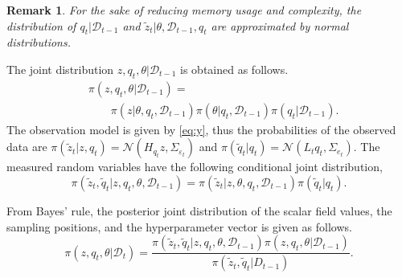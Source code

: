 \documentclass[letterpaper, 10 pt, conference]{ieeeconf}
\newtheorem{rem}[thm]{Remark} \newtheorem{example}[thm]{Example}
\newcommand{\mc}[1]{\mathcal{#1}} \newcommand{\mb}[1]{\mathbf{#1}}
\newcommand{\N}{\mc{N}}
\newcommand{\changed}[2]{{\color{blue} #2}}
\newcommand{\D}[2]{\mc{D}_{#2}}
\newcommand{\q}[1]{{q_{#1}}}
\begin{document}
\begin{rem}
For the sake of reducing memory usage and complexity, the distribution of $\q{t}|\D{0}{t - 1}$ and $\tilde{z}_{t}|\theta,\D{1}{t-1},\q{t}$ are approximated by normal distributions.
\end{rem}

The joint distribution $z,\q{t},\theta |\D{0}{t - 1}$ is obtained as follows.
\begin{equation}
\begin{split}
&\pi \left( z,\q{t},\theta |\D{0}{t - 1} \right) = \\ &\quad \quad \pi \left( z|\theta,q_t ,\D{0}{t - 1} \right) \pi \left( \theta |q_t, \D{0}{t - 1} \right) \pi \left( \q{t}|\D{0}{t - 1} \right).
\end{split}
\label{eq:26266526}
\end{equation}
The observation model is given by \eqref{eq:y}, thus the probabilities of the observed data are $\pi \left( \tilde{z}_t|z,\q{t} \right) = \N \left( H_{\q{t}} z,\Sigma_{\varepsilon_t} \right)$ and $\pi \left( \tilde{q}_t|\q{t} \right) = \N \left( L_t \q{t},\Sigma_{e_t} \right)$.
The measured random variables have the following conditional joint distribution,
\begin{equation}
\pi \left( \tilde{z}_t,\tilde{q}_t|z,\q{t},\theta ,\D{0}{t - 1} \right) = \pi \left( \tilde{z}_t|z,\theta,\q{t},\D{}{t-1} \right) \pi \left( \tilde{q}_t|\q{t} \right).
\label{eq:}
\end{equation}

From Bayes' rule, the posterior joint distribution of the scalar field values, the sampling positions, and the hyperparameter vector is given as follows.
\begin{equation}
\pi \left( z,\q{t},\theta |\D{0}{t} \right) = \frac{ \pi \left( \tilde{z}_t, \tilde{q}_t|z,\q{t},\theta ,\D{0}{t - 1} \right) \pi \left(z,\q{t},\theta |\D{0}{t - 1} \right)}{{\pi \left( {{{\tilde z}_t},{{\tilde q}_t}|{D_{t - 1}}} \right)}}.
\label{eq:joint_posterior}
\end{equation}
\end{document}
